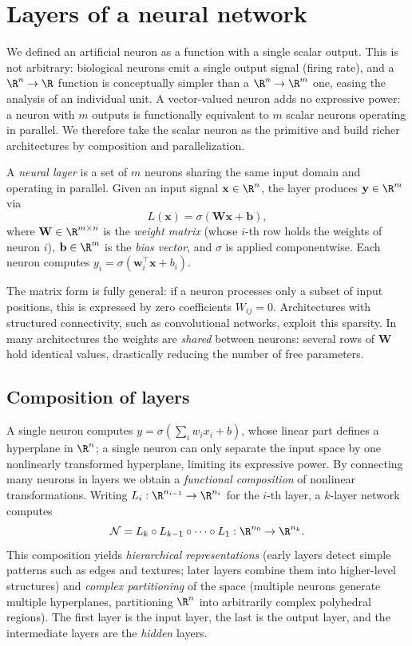 \section{Layers of a neural network}
\label{sec:found:layers}

We defined an artificial neuron as a function with a single scalar output. This
is not arbitrary: biological neurons emit a single output signal (firing rate),
and a $\R^n \to \R$ function is conceptually simpler than a $\R^n \to \R^m$ one,
easing the analysis of an individual unit. A vector-valued neuron adds no
expressive power: a neuron with $m$ outputs is functionally equivalent to $m$
scalar neurons operating in parallel. We therefore take the scalar neuron as the
primitive and build richer architectures by composition and parallelization.

\begin{definition}
\label{def:found:layer}
A \emph{neural layer} is a set of $m$ neurons sharing the same input domain and
operating in parallel. Given an input signal $\mathbf{x} \in \R^n$, the layer
produces $\mathbf{y} \in \R^m$ via
\[
  L(\mathbf{x}) = \sigma(\mathbf{W}\mathbf{x} + \mathbf{b}),
\]
where $\mathbf{W} \in \R^{m \times n}$ is the \emph{weight matrix} (whose $i$-th
row holds the weights of neuron $i$), $\mathbf{b} \in \R^m$ is the \emph{bias
vector}, and $\sigma$ is applied componentwise. Each neuron computes
$y_i = \sigma(\mathbf{w}_i^\top \mathbf{x} + b_i)$.
\end{definition}

The matrix form is fully general: if a neuron processes only a subset of input
positions, this is expressed by zero coefficients $W_{ij} = 0$. Architectures
with structured connectivity, such as convolutional networks, exploit this
sparsity. In many architectures the weights are \emph{shared} between neurons:
several rows of $\mathbf{W}$ hold identical values, drastically reducing the
number of free parameters.

\subsection{Composition of layers}
\label{sec:found:composition}

A single neuron computes $y = \sigma(\sum_i w_i x_i + b)$, whose linear part
defines a hyperplane in $\R^n$; a single neuron can only separate the input space
by one nonlinearly transformed hyperplane, limiting its expressive power. By
connecting many neurons in layers we obtain a \emph{functional composition} of
nonlinear transformations. Writing $L_i : \R^{n_{i-1}} \to \R^{n_i}$ for the
$i$-th layer, a $k$-layer network computes
\[
  \mathcal{N} = L_k \circ L_{k-1} \circ \cdots \circ L_1 :
  \R^{n_0} \to \R^{n_k}.
\]
This composition yields \emph{hierarchical representations} (early layers detect
simple patterns such as edges and textures; later layers combine them into
higher-level structures) and \emph{complex partitioning} of the space (multiple
neurons generate multiple hyperplanes, partitioning $\R^n$ into arbitrarily
complex polyhedral regions). The first layer is the input layer, the last is the
output layer, and the intermediate layers are the \emph{hidden} layers.

